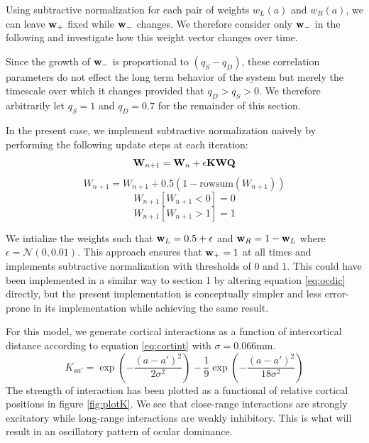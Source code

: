 \documentclass{article}
\begin{document}
Using subtractive normalization for each pair of weights $w_L(a)$ and $w_R(a)$, we can leave ${\bf w}_+$ fixed while ${\bf w}_-$ changes. We therefore consider only ${\bf w}_-$ in the following and investigate how this weight vector changes over time.

Since the growth of ${\bf w}_-$ is proportional to $(q_S-q_D)$, these correlation parameters do not effect the long term behavior of the system but merely the timescale over which it changes provided that $q_D > q_S > 0$. We therefore arbitrarily let $q_S = 1$ and $q_D = 0.7$ for the remainder of this section. 

In the present case, we implement subtractive normalization naively by performing the following update steps at each iteration:
\begin{equation}\label{eq:ocdic2}
{\bf W}_{n+1} = {\bf W}_n + \epsilon \bf K W Q
\end{equation}
\begin{equation}
W_{n+1} = W_{n+1} + 0.5 (1 - \text{rowsum}(W_{n+1}))
\end{equation}
\begin{equation}
W_{n+1}[ W_{n+1} < 0 ] = 0
\end{equation}
\begin{equation}\label{eq:subnorm}
W_{n+1}[ W_{n+1} > 1 ] = 1
\end{equation}

We intialize the weights such that ${\bf w}_L = 0.5 + \epsilon$ and ${\bf w}_R = 1 - {\bf w}_L$ where $\epsilon =  \mathcal{N}(0, 0.01)$. This approach ensures that ${\bf w}_+ = 1$ at all times and implements subtractive normalization with thresholds of 0 and 1. This could have been implemented in a similar way to section 1 by altering equation \ref{eq:ocdic} directly, but the present implementation is conceptually simpler and less error-prone in its implementation while achieving the same result.

For this model, we generate cortical interactions as a function of intercortical distance according to equation \ref{eq:cortint} with $\sigma = 0.066$mm.
\begin{equation}\label{eq:cortint}
K_{aa'} = \exp{(-\dfrac{(a-a')^2}{2\sigma^2})} - \dfrac{1}{9}\exp{(-\dfrac{(a-a')^2}{18\sigma^2})}
\end{equation}
The strength of interaction has been plotted as a functional of relative cortical positions in figure \ref{fig:plotK}. We see that close-range interactions are strongly excitatory while long-range interactions are weakly inhibitory. This is what will result  in an oscillatory pattern of ocular dominance.
\end{document}
